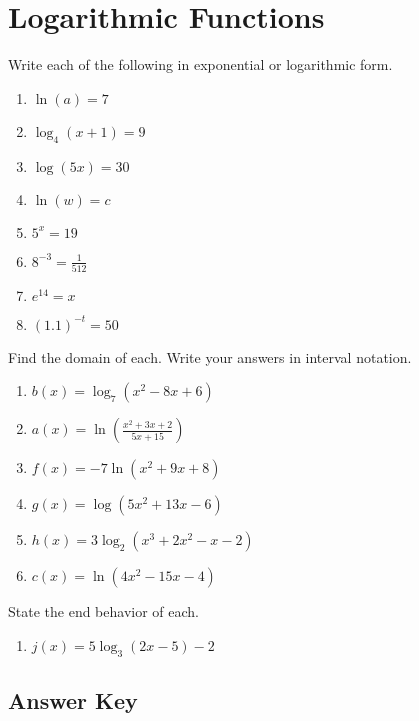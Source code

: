 \chapter{Logarithmic Functions}

Write each of the following in exponential or logarithmic form.
\begin{enumerate}
	\item $\ln(a) = 7$
    \item $\log_4 (x+1) = 9$
    \item $\log (5x) = 30$
    \item $\ln(w) = c$
    \item $5^x = 19$
    \item $8^{-3} = \frac{1}{512}$
    \item $e^{14} = x$
    \item $(1.1)^{-t} = 50$
\end{enumerate}	\setcounter{Review}{\value{enumi}}


Find the domain of each. Write your answers in interval notation.
\begin{enumerate}	\setcounter{enumi}{\value{Review}}
	\item $b(x) = \log_7\left(x^2 - 8x + 6\right)$
	\item $a(x) = \ln\left(\frac{x^2+3x+2}{5x+15}\right)$
	\item $f(x) = -7\ln\left(x^2 + 9x + 8\right)$
	\item $g(x) = \log\left(5x^2 + 13x - 6\right)$
	\item $h(x) = 3\log_2\left(x^3+2x^2-x-2\right)$
	\item $c(x) = \ln\left(4x^2 - 15x - 4\right)$
\end{enumerate}
\setcounter{Review}{\value{enumi}}

State the end behavior of each.
\begin{enumerate}	\setcounter{enumi}{\value{Review}}
	\item $j(x) = 5\log_3\left(2x-5\right) - 2$
\end{enumerate}

\newpage

\section{Answer Key}

